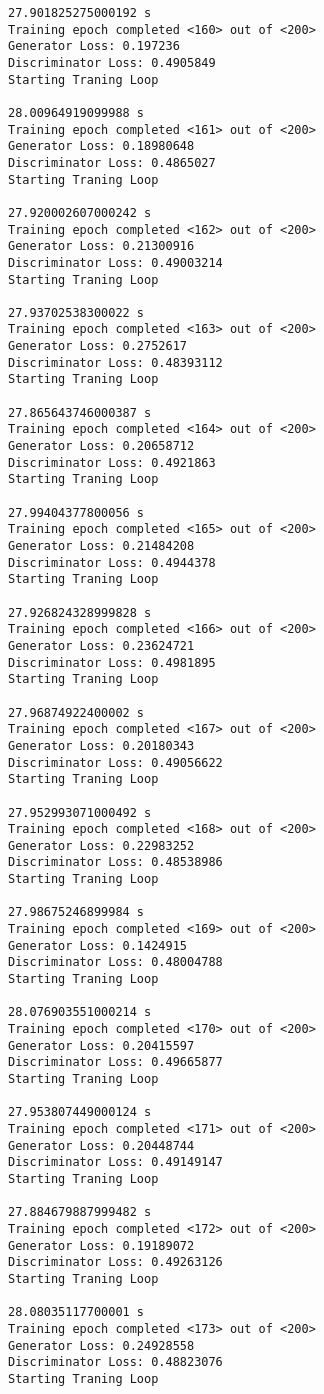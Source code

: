 \documentclass[11pt]{article}
\begin{document}
\begin{Verbatim}[commandchars=\\\{\}]
27.901825275000192 s
Training epoch completed <160> out of <200>
Generator Loss: 0.197236
Discriminator Loss: 0.4905849
Starting Traning Loop 

28.00964919099988 s
Training epoch completed <161> out of <200>
Generator Loss: 0.18980648
Discriminator Loss: 0.4865027
Starting Traning Loop 

27.920002607000242 s
Training epoch completed <162> out of <200>
Generator Loss: 0.21300916
Discriminator Loss: 0.49003214
Starting Traning Loop 

27.93702538300022 s
Training epoch completed <163> out of <200>
Generator Loss: 0.2752617
Discriminator Loss: 0.48393112
Starting Traning Loop 

27.865643746000387 s
Training epoch completed <164> out of <200>
Generator Loss: 0.20658712
Discriminator Loss: 0.4921863
Starting Traning Loop 

27.99404377800056 s
Training epoch completed <165> out of <200>
Generator Loss: 0.21484208
Discriminator Loss: 0.4944378
Starting Traning Loop 

27.926824328999828 s
Training epoch completed <166> out of <200>
Generator Loss: 0.23624721
Discriminator Loss: 0.4981895
Starting Traning Loop 

27.96874922400002 s
Training epoch completed <167> out of <200>
Generator Loss: 0.20180343
Discriminator Loss: 0.49056622
Starting Traning Loop 

27.952993071000492 s
Training epoch completed <168> out of <200>
Generator Loss: 0.22983252
Discriminator Loss: 0.48538986
Starting Traning Loop 

27.98675246899984 s
Training epoch completed <169> out of <200>
Generator Loss: 0.1424915
Discriminator Loss: 0.48004788
Starting Traning Loop 

28.076903551000214 s
Training epoch completed <170> out of <200>
Generator Loss: 0.20415597
Discriminator Loss: 0.49665877
Starting Traning Loop 

27.953807449000124 s
Training epoch completed <171> out of <200>
Generator Loss: 0.20448744
Discriminator Loss: 0.49149147
Starting Traning Loop 

27.884679887999482 s
Training epoch completed <172> out of <200>
Generator Loss: 0.19189072
Discriminator Loss: 0.49263126
Starting Traning Loop 

28.08035117700001 s
Training epoch completed <173> out of <200>
Generator Loss: 0.24928558
Discriminator Loss: 0.48823076
Starting Traning Loop 


\end{Verbatim}
\end{document}
